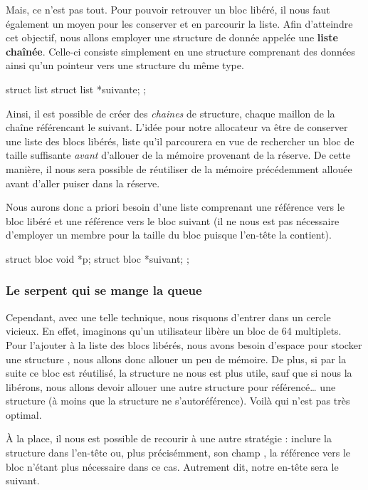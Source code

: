Mais, ce n'est pas tout. Pour pouvoir retrouver un bloc libéré, il nous
faut également un moyen pour les conserver et en parcourir la liste.
Afin d'atteindre cet objectif, nous allons employer une structure de
donnée appelée une \textbf{liste chaînée}. Celle-ci consiste simplement
en une structure comprenant des données ainsi qu'un pointeur vers une
structure du même type.

\begin{C}
struct list
{
    struct list *suivante;
};
\end{C}

Ainsi, il est possible de créer des \emph{chaines} de structure, chaque
maillon de la chaîne référencant le suivant. L'idée pour notre
allocateur va être de conserver une liste des blocs libérés, liste qu'il
parcourera en vue de rechercher un bloc de taille suffisante
\emph{avant} d'allouer de la mémoire provenant de la réserve. De cette
manière, il nous sera possible de réutiliser de la mémoire précédemment
allouée avant d'aller puiser dans la réserve.

Nous aurons donc a priori besoin d'une liste comprenant une référence
vers le bloc libéré et une référence vers le bloc suivant (il ne nous
est pas nécessaire d'employer un membre pour la taille du bloc puisque
l'en-tête la contient).

\begin{C}
struct bloc
{
    void *p;
    struct bloc *suivant;
};
\end{C}

\subsubsection{Le serpent qui se mange la queue}
\label{le-serpent-qui-se-mange-la-queue}

Cependant, avec une telle technique, nous risquons d'entrer dans un
cercle vicieux. En effet, imaginons qu'un utilisateur libère un bloc de
64 multiplets. Pour l'ajouter à la liste des blocs libérés, nous avons
besoin d'espace pour stocker une structure , nous allons
donc allouer un peu de mémoire. De plus, si par la suite ce bloc est
réutilisé, la structure  ne nous est plus utile, sauf que
si nous la libérons, nous allons devoir allouer une autre structure
 pour référencé\ldots{} une structure  (à
moins que la structure ne s'autoréférence). Voilà qui n'est pas très
optimal.

À la place, il nous est possible de recourir à une autre stratégie :
inclure la structure  dans l'en-tête ou, plus précisémment,
son champ , la référence vers le bloc n'étant plus
nécessaire dans ce cas. Autrement dit, notre en-tête sera le suivant.

